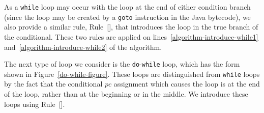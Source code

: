 As a \texttt{while} loop may occur with the loop at the end of either
condition branch (since the loop may be created by a \texttt{goto}
instruction in the Java bytecode), we also provide a similar rule,
Rule~[], that introduces the loop in the
true branch of the conditional.
These two rules are applied on lines~\ref{algorithm-introduce-while1}
and~\ref{algorithm-introduce-while2} of the algorithm.

The next type of loop we consider is the \texttt{do}-\texttt{while}
loop, which has the form shown in Figure~\ref{do-while-figure}.
These loops are distinguished from \texttt{while} loops by the fact
that the conditional $pc$ assignment which causes the loop is at the
end of the loop, rather than at the beginning or in the middle.
We introduce these loops using
Rule~[].
